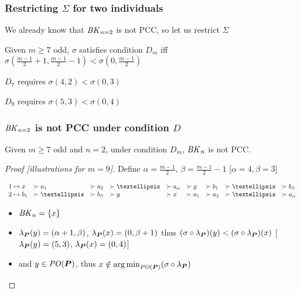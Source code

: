 \documentclass[french, english]{beamer}
\begin{document}
\begin{frame}
	\frametitle{Restricting $\Sigma$ for two individuals}
	We already know that $\BK[n = 2]$ is not PCC, so let us restrict $\Sigma$
	\begin{definition}[Condition $D_m$]
		Given $m ≥ 7$ odd, $\sigma$ satisfies condition $D_m$ iff $\sigma(\frac{m - 1}{2} + 1, \frac{m - 1}{2} - 1) < \sigma(0, \frac{m - 1}{2})$
	\end{definition}
	\begin{example}
		$D_7$ requires $\sigma(4, 2) < \sigma(0, 3)$

		$D_9$ requires $\sigma(5, 3) < \sigma(0, 4)$
	\end{example}
\end{frame}

\begin{frame}
	\frametitle{$\BK[n = 2]$ is not PCC under condition $D$}
	\begin{theorem}
		Given $m ≥ 7$ odd and $n = 2$, under condition $D_m$, $\BK[n]$ is not PCC.
	\end{theorem}
	\begin{proof}[Proof \hfill {\small [illustrations for $m = 9$]}]
		Define $\alpha = \frac{m - 1}{2}$, $\beta = \frac{m - 1}{2} - 1$ \hfill {\small [$\alpha = 4, \beta = 3$]}

		$\begin{array}{r@{\hspace{1mm} \mapsto \hspace{1mm}}lllllllll}
			1 & x &\pref a_1 &\pref a_2 &\pref … &\pref a_\alpha &\pref y &\pref b_1 &\pref … &\pref b_\beta\\
			2 & b_1 &\pref … &\pref b_\beta &\pref y &\pref x &\pref a_1 &\pref a_2 &\pref … &\pref a_\alpha\\
		\end{array}$%
		\begin{itemize}
			\item $\BK[n] = \set{x}$
			\item $\lambda_{\bm{P}}(y) = (\alpha + 1, \beta)$, $\lambda_{\bm{P}}(x) = (0, \beta + 1)$ thus $(\sigma \circ \lambda_{\bm{P}})(y) < (\sigma \circ \lambda_{\bm{P}})(x)$ \hfill {\small [$\lambda_{\bm{P}}(y) = (5, 3)$, $\lambda_{\bm{P}}(x) = (0, 4)$]}
			\item and $y \in \mathit{PO}(\boldsymbol{P})$, thus $x \notin \operatorname*{arg\,min}_{\mathit{PO}(\boldsymbol{P})}(\sigma \circ \lambda_{\bm{P}})$ \qedhere
		\end{itemize}
	\end{proof}
\end{frame}
\end{document}
